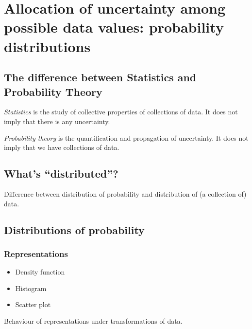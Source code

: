 \documentclass[
  a4paper,
  DIV=11,
  numbers=noendperiod,
  oneside]{scrreprt}
\begin{document}
\hypertarget{allocation-of-uncertainty-among-possible-data-values-probability-distributions}{%
\chapter{Allocation of uncertainty among possible data values:
probability
distributions}\label{allocation-of-uncertainty-among-possible-data-values-probability-distributions}}

\hypertarget{the-difference-between-statistics-and-probability-theory}{%
\section{The difference between Statistics and Probability
Theory}\label{the-difference-between-statistics-and-probability-theory}}

\emph{Statistics} is the study of collective properties of collections
of data. It does not imply that there is any uncertainty.

\emph{Probability theory} is the quantification and propagation of
uncertainty. It does not imply that we have collections of data.

\hypertarget{whats-distributed}{%
\section{What's ``distributed''?}\label{whats-distributed}}

Difference between distribution of probability and distribution of (a
collection of) data.

\hypertarget{distributions-of-probability}{%
\section{Distributions of
probability}\label{distributions-of-probability}}

\hypertarget{representations}{%
\subsection{Representations}\label{representations}}

\begin{itemize}
\item
  Density function
\item
  Histogram
\item
  Scatter plot
\end{itemize}

Behaviour of representations under transformations of data.
\end{document}
